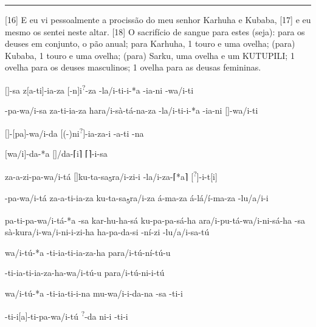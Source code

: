 \vspace{10pt}
\hrule
\vspace{10pt}


[16] E eu vi pessoalmente a procissão do meu senhor Karhuha e Kubaba,
[17] e eu mesmo os sentei neste altar.
	[18] O sacrifício de sangue para estes (seja):
para os deuses em conjunto, o pão anual;
para Karhuha, 1 touro e uma ovelha;
(para) Kubaba, 1 touro e uma ovelha;
(para) Sarku, uma ovelha e um KUTUPILI\@;
1 ovelha para os deuses masculinos;
1 ovelha para as deusas femininas.


\setcounter{parcount}{18}
\begin{parnumbersa}[]

	\raggedright%
	\itshape%


	$[$\logo{\ldots{}}$]$-sa z$[$a-ti$]$-ia-za $[$-n$]$i\textsuperscript{?}-za -la/i-ti-i-*a \lbreak{} -ia-ni \lmasc{}-wa/i-ti

	\lmasc{}-pa-wa/i-sa \lmasc{}za-ti-ia-za ha\logo{+}ra/i-sà-tá-na-za -la/i-ti-i-*a \lmasc{}-ia-ni $[$$]$-wa/i-ti

	$[$\lmasc{}$]$-$[$pa$]$-wa/i-da
	$[${(-)}ni\textsuperscript{?}$]$-ia-za-i -a-ti -na

	$[$wa/i$]$-da-*a $[$$]$/da-\textsc{⌈}i\textsc{⌉} \textsc{⌈}\lmasc{}\textsc{⌉}-i-sa

	\lmasc{}za-a-zi-pa-wa/i-tá
	$[$$]$ku-ta-sa\textsubscript{5}\logo{+}ra/i-zi-i
	-la/i-za-\textsc{⌈}*a\textsc{⌉} [\textsuperscript{?}]\lbreak{}-i-t[i]

	\lmasc{}-pa-wa/i-tá \lmasc{}za-a-ti-ia-za
	\lmasc{}ku-ta-sa\textsubscript{5}\logo{+}ra/i-za \lmasc{}á-ma-za \lmasc{}á-lá/í-ma-za \lmasc{} \lmasc{}-lu/a/i-i

	pa-ti-pa-wa/i-tá-*a  -sa kar-hu-ha-sá ku-pa-pa-sá-ha a\logo{+}ra/i-pu-tá-wa/i-ni-sá-ha -sa sà-ku\logo{+}ra/i-wa/i-ni-i-zi-ha ha\lbreak{}-pa-da-si -ní-zi \lmasc{}-lu/a/i-sa-tú

	wa/i-tú-*a \lmasc{}-ti-ia-ti-ia-za-ha \lmasc{}pa\logo{+}ra/i-tú-ní-tú-u

	-ti-ia-ti-ia-za-ha-wa/i-tú-u \lmasc{}pa\logo{+}ra/i-tú-ni-i-tú

	wa/i-tú-*a \lmasc{}-ti-ia-ti-i-na \lmasc{}mu-wa/i-i-da-na -sa \lmasc{}-ti-i

	-ti-i$[$a$]$-ti-pa-wa/i-tú
	\textsuperscript{?}-da \lmasc{}ni-i \lmasc{}-ti-i


\end{parnumbersa}

